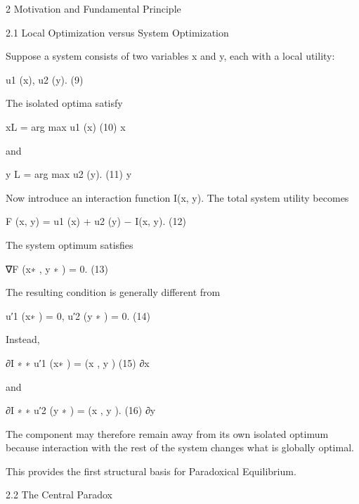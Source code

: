 \documentclass[10pt,a4paper]{article}
\begin{document}
\begin{ManuscriptText}
2     Motivation and Fundamental Principle

2.1   Local Optimization versus System Optimization

Suppose a system consists of two variables x and y, each with a local utility:


                                        u1 (x),           u2 (y).                              (9)

The isolated optima satisfy


                                       xL = arg max u1 (x)                                    (10)
                                                      x


and


                                      y L = arg max u2 (y).                                 (11)
                                                         y


Now introduce an interaction function I(x, y). The total system utility becomes


                               F (x, y) = u1 (x) + u2 (y) − I(x, y).                        (12)

The system optimum satisfies


                                         ∇F (x∗ , y ∗ ) = 0.                                (13)

The resulting condition is generally different from


                                  u′1 (x∗ ) = 0,             u′2 (y ∗ ) = 0.                (14)

Instead,

                                                     ∂I ∗ ∗
                                      u′1 (x∗ ) =       (x , y )                            (15)
                                                     ∂x

and

                                                     ∂I ∗ ∗
                                      u′2 (y ∗ ) =      (x , y ).                           (16)
                                                     ∂y

The component may therefore remain away from its own isolated optimum because interaction
with the rest of the system changes what is globally optimal.

This provides the first structural basis for Paradoxical Equilibrium.


2.2   The Central Paradox


\end{ManuscriptText}
\end{document}
